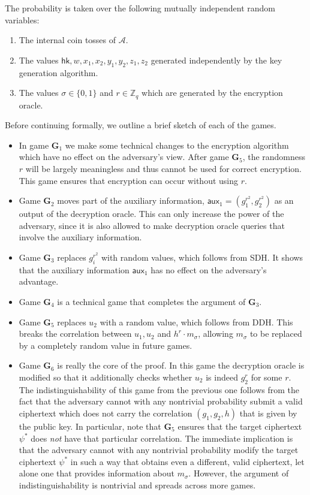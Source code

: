 \documentclass[10pt,a4paper]{article}
\newcommand{\adv}{\mathcal{A}}
\newcommand{\aux}{\mathsf{aux}}
\newcommand{\hk}{\mathsf{hk}}
\newcommand{\game}{\mathbf{G}}
\newcommand{\Z}{\mathbb{Z}}
\begin{document}
	The probability is taken over the following mutually independent random variables:	\begin{enumerate}
		\item The internal coin tosses of $\adv$.
		\item The values $\hk,w,x_1,x_2,y_1,y_2,z_1,z_2$ generated independently by the key generation algorithm.
		\item The values $\sigma\in\{0,1\}$ and $r\in\Z_q$ which are generated by the encryption oracle.
	\end{enumerate}
	
	Before continuing formally, we outline a brief sketch of each of the games.
	
	\begin{itemize}
		\item In game $\game_1$ we make some technical changes to the encryption algorithm which have no effect on the adversary's view. After game $\game_5$, the randomness $r$ will be largely meaningless and thus cannot be used for correct encryption. This game ensures that encryption can occur without using $r$.
		\item Game $\game_2$ moves part of the auxiliary information, $\aux_1 =(g_1^{r^2}, g_2^{r^2})$ as an output of the decryption oracle. This can only increase the power of the adversary, since it is also allowed to make decryption oracle queries that involve the auxiliary information.
		\item Game $\game_3$ replaces $g_i^{r^2}$ with random values, which follows from SDH. It shows that the auxiliary information $\aux_1$ has no effect on the adversary's advantage.
		\item Game $\game_4$ is a technical game that completes the argument of $\game_3$.
		\item Game $\game_5$ replaces $u_2$ with a random value, which follows from DDH. This breaks the correlation between $u_1, u_2$ and $h^r\cdot m_\sigma$, allowing $m_\sigma$ to be replaced by a completely random value in future games.
		\item Game $\game_6$ is really the core of the proof. In this game the decryption oracle is modified so that it additionally checks whether $u_2$ is indeed $g_2^r$ for some $r$. The indistinguishability of this game from the previous one follows from the fact that the adversary cannot with any nontrivial probability submit a valid ciphertext which does not carry the correlation $(g_1, g_2, h)$ that is given by the public key. In particular, note that $\game_5$ ensures that the target ciphertext $\psi^{*}$ does \textit{not} have that particular correlation. The immediate implication is that the adversary cannot with any nontrivial probability modify the target ciphertext $\psi^{*}$ in such a way that obtains even a different, valid ciphertext, let alone one that provides information about $m_\sigma$. However, the argument of indistinguishability is nontrivial and spreads across more games.

\end{itemize}
\end{document}
